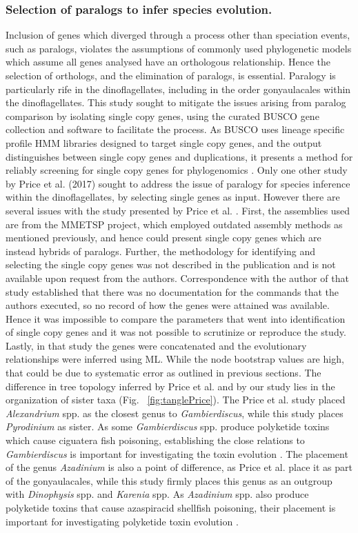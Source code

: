 \documentclass[fleqn,10pt,lineno]{wlpeerj} %
\begin{document}
\subsubsection*{Selection of paralogs to infer species evolution.}
Inclusion of genes which diverged through a process other than speciation events, such as paralogs, violates the assumptions of commonly used phylogenetic models which assume all genes analysed have an orthologous relationship.
Hence the selection of orthologs, and the elimination of paralogs, is essential.
Paralogy is particularly rife in the dinoflagellates, including in the order gonyaulacales within the dinoflagellates. 
This study sought to mitigate the issues arising from paralog comparison by isolating single copy genes, using the curated BUSCO gene collection and software to facilitate the process. 
As BUSCO uses lineage specific profile HMM libraries designed to target single copy genes, and the output distinguishes between single copy genes and duplications, it presents a method for reliably screening for single copy genes for phylogenomics \cite{waterhouse2017busco}.
Only one other study by Price et al. (2017) sought to address the issue of paralogy for species inference within the dinoflagellates, by selecting single genes as input. 
However there are several issues with the study presented by Price et al. \cite{price2017robust}. 
First, the assemblies used are from the MMETSP project, which employed outdated assembly methods as mentioned previously, and hence could present single copy genes which are instead hybrids of paralogs. 
Further, the methodology for identifying and selecting the single copy genes was not described in the publication and is not available upon request from the authors. 
Correspondence with the author of that study established that there was no documentation for the commands that the authors executed, so no record of how the genes were attained was available. 
Hence it was impossible to compare the parameters that went into identification of single copy genes and it was not possible to scrutinize or reproduce the study.
Lastly, in that study the genes were concatenated and the evolutionary relationships were inferred using ML. 
While the node bootstrap values are high, that could be due to systematic error as outlined in previous sections.
The difference in tree topology inferred by Price et al. and by our study lies in the organization of sister taxa (Fig. ~\ref{fig:tanglePrice}). 
The Price et al. study placed \emph{Alexandrium} spp. as the closest genus to \emph{Gambierdiscus}, while this study places \emph{Pyrodinium} as sister. 
As some \emph{Gambierdiscus} spp. produce polyketide toxins which cause ciguatera fish poisoning, establishing the close relations to \emph{Gambierdiscus} is important for investigating the toxin evolution \cite{pawlowiez2014transcriptome}.
The placement of the genus \emph{Azadinium} is also a point of difference, as Price et al. place it as part of the gonyaulacales, while this study firmly places this genus as an outgroup with \emph{Dinophysis} spp. and \emph{Karenia} spp.
As \emph{Azadinium} spp. also produce polyketide toxins that cause azaspiracid shellfish poisoning, their placement is important for investigating polyketide toxin evolution \cite{meyer2015transcriptomic}.
 
\end{document}
